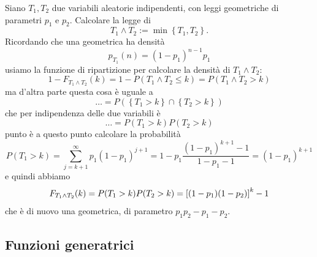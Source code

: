 \documentclass[11pt]{scrartcl}
\begin{document}
	\begin{example}
		Siano $T_1,T_2$ due variabili aleatorie indipendenti, con leggi geometriche di parametri $p_1$ e $p_2$. Calcolare la legge di
		$$T_1\land T_2:=\min\left\{T_1,T_2\right\}.$$
		Ricordando che una geometrica ha densità
		$$p_{T_1}(n)=(1-p_1)^{n-1}p_1$$
		usiamo la funzione di ripartizione per calcolare la densità di $T_1\land T_2$:
		$$1-F_{T_1\land T_2}(k)=1-P\left(T_1\land T_2\le k\right)=P(T_1\land T_2>k)$$
		ma d'altra parte questa cosa è uguale a
		$$\dots=P(\left\{T_1> k\right\}\cap\left\{T_2>k\right\})$$
		che per indipendenza delle due variabili è
		$$\dots=P(T_1>k)P(T_2>k)$$
		punto è a questo punto calcolare la probabilità
		$$P(T_1>k)=\sum_{j=k+1}^{\infty}p_1(1-p_1)^{j+1}=1-p_1\frac{(1-p_1)^{k+1}-1}{1-p_1-1}=(1-p_1)^{k+1}$$
		e quindi abbiamo
		$$\-F_{T_1\land T_2}(k)=P(T_1>k)P(T_2>k)=\left[(1-p_1)(1-p_2)\right]^k-1$$
		che è di nuovo una geometrica, di parametro $p_1p_2-p_1-p_2$.
	\end{example}
	
	\subsection{Funzioni generatrici}
	
\end{document}
